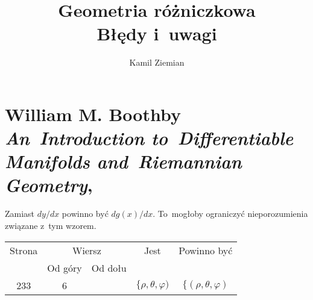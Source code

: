 \documentclass[a4paper,11pt]{article}
\title{Geometria różniczkowa \\
  {\Large Błędy i~uwagi}}
\author{Kamil Ziemian}
\numberwithin{equation}{section}
\begin{document}





\maketitle %





\section{ %
  William M. Boothby \\[0.3em]
  \textit{An~Introduction to~Differentiable Manifolds and~Riemannian
    Geometry}, \cite{BoothbyIntroductionToDifferentiableManifolds1986}}

\vspace{0em}



\vspace{0em}


\noindent
{} Zamiast $dy/dx$ powinno być $d g( x )/dx$.
To~mogłoby ograniczyć nieporozumienia związane z~tym wzorem.

\VerSpaceFour







\begin{center}

  \begin{tabular}{|c|c|c|c|c|}
    \hline
    Strona & \multicolumn{2}{c|}{Wiersz} & Jest
                              & Powinno być \\ \cline{2-3}
    & Od góry & Od dołu & & \\
    \hline
    233 &  6 & & $\{ \rho, \theta, \varphi )$ & $\{ ( \rho, \theta, \varphi )$ \\
    \hline
  \end{tabular}

\end{center}
\end{document}

